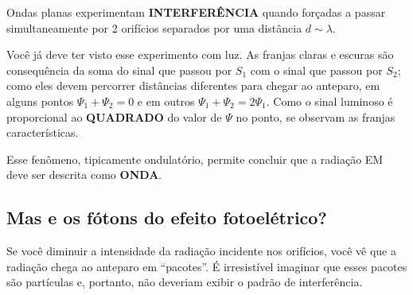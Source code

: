 Ondas planas experimentam \textbf{INTERFERÊNCIA} quando forçadas a passar simultaneamente por 2 orifícios separados por uma distância $d \sim \lambda$.

\begin{center}
\end{center}

Você já deve ter visto esse experimento com luz. As franjas claras e escuras são consequência da soma do sinal que passou por $S_1$ com o sinal que passou por $S_2$; como eles devem percorrer distâncias diferentes para chegar ao anteparo, em alguns pontos $\Psi_1 + \Psi_2 = 0$ e em outros $\Psi_1 + \Psi_2 = 2\Psi_1$. Como o sinal luminoso é proporcional ao \textbf{QUADRADO} do valor de $\Psi$ no ponto, se observam as franjas características.

Esse fenômeno, tipicamente ondulatório, permite concluir que a radiação EM deve ser descrita como \textbf{ONDA}.

\subsection*{Mas e os fótons do efeito fotoelétrico?}

Se você diminuir a intensidade da radiação incidente nos orifícios, você vê que a radiação chega ao anteparo em ``pacotes''. É irresistível imaginar que esses pacotes são partículas e, portanto, não deveriam exibir o padrão de interferência.

